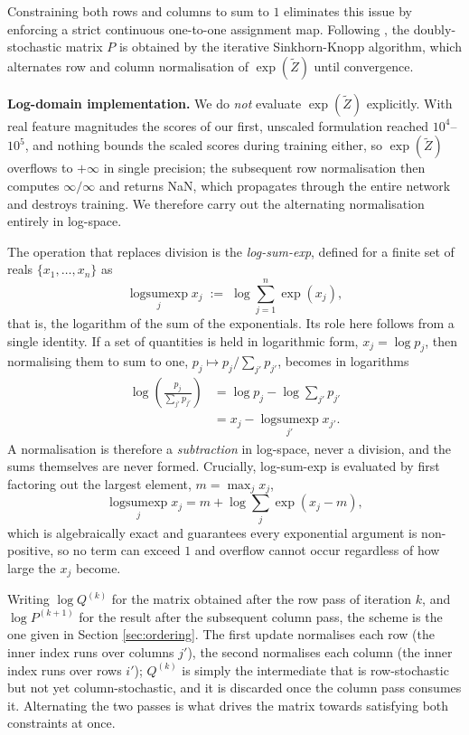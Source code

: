 \documentclass[10pt,a4paper,twocolumn]{article}
\begin{document}
	Constraining both rows and columns to sum to $1$ eliminates this issue by enforcing a strict continuous one-to-one assignment map. Following \cite{mena2018}, the doubly-stochastic matrix $P$ is obtained by the iterative Sinkhorn-Knopp algorithm, which alternates row and column normalisation of $\exp(\tilde{Z})$ until convergence.
	
	\textbf{Log-domain implementation.} We do \emph{not} evaluate $\exp(\tilde{Z})$ explicitly. With real feature magnitudes the scores of our first, unscaled formulation reached $10^{4}$--$10^{5}$, and nothing bounds the scaled scores during training either, so $\exp(\tilde{Z})$ overflows to $+\infty$ in single precision; the subsequent row normalisation then computes $\infty/\infty$ and returns NaN, which propagates through the entire network and destroys training. We therefore carry out the alternating normalisation entirely in log-space.

	The operation that replaces division is the \emph{log-sum-exp}, defined for a finite set of reals
	$\{x_1,\dots,x_n\}$ as
	$$\operatorname*{logsumexp}_{j} x_j \;:=\; \log \sum_{j=1}^{n} \exp(x_j),$$
	that is, the logarithm of the sum of the exponentials. Its role here follows from a single identity. If a set of quantities is held in logarithmic form, $x_j = \log p_j$, then normalising them to sum to one, $p_j \mapsto p_j / \sum_{j'} p_{j'}$, becomes in logarithms
	$$\begin{aligned}\log\!\left(\frac{p_j}{\sum_{j'} p_{j'}}\right) &= \log p_j - \log \sum_{j'} p_{j'} \\ &= x_j -
	\operatorname*{logsumexp}_{j'} x_{j'} .\end{aligned}$$
	A normalisation is therefore a \emph{subtraction} in log-space, never a division, and the sums themselves are never formed. Crucially, log-sum-exp is evaluated by first factoring out the largest element, $m = \max_j x_j$,
	$$\operatorname*{logsumexp}_{j} x_j = m + \log \sum_{j} \exp(x_j - m),$$
	which is algebraically exact and guarantees every exponential argument is non-positive, so no term can exceed $1$ and overflow cannot occur regardless of how large the $x_j$ become.

	Writing $\log Q^{(k)}$ for the matrix obtained after the row pass of iteration $k$, and $\log P^{(k+1)}$ for the result after the subsequent column pass, the scheme is the one given in Section \ref{sec:ordering}. The first update normalises each row (the inner index runs over columns $j'$), the second normalises each column (the inner index runs over rows $i'$); $Q^{(k)}$ is simply the intermediate that is row-stochastic but not yet column-stochastic, and it is discarded once the column pass consumes it. Alternating the two passes is what drives the matrix towards satisfying both constraints at once.
	
\end{document}
